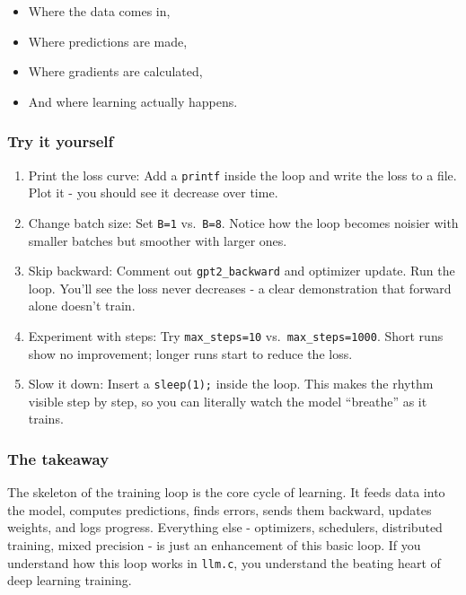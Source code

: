 \documentclass[
  letterpaper,
  DIV=11,
  numbers=noendperiod]{scrreprt}
\providecommand{\tightlist}{%
  \setlength{\itemsep}{0pt}\setlength{\parskip}{0pt}}
\begin{document}
\begin{itemize}
\tightlist
\item
  Where the data comes in,
\item
  Where predictions are made,
\item
  Where gradients are calculated,
\item
  And where learning actually happens.
\end{itemize}

\subsubsection{Try it yourself}\label{try-it-yourself-30}

\begin{enumerate}
\def\labelenumi{\arabic{enumi}.}
\tightlist
\item
  Print the loss curve: Add a \texttt{printf} inside the loop and write
  the loss to a file. Plot it - you should see it decrease over time.
\item
  Change batch size: Set \texttt{B=1} vs.~\texttt{B=8}. Notice how the
  loop becomes noisier with smaller batches but smoother with larger
  ones.
\item
  Skip backward: Comment out \texttt{gpt2\_backward} and optimizer
  update. Run the loop. You'll see the loss never decreases - a clear
  demonstration that forward alone doesn't train.
\item
  Experiment with steps: Try \texttt{max\_steps=10}
  vs.~\texttt{max\_steps=1000}. Short runs show no improvement; longer
  runs start to reduce the loss.
\item
  Slow it down: Insert a \texttt{sleep(1);} inside the loop. This makes
  the rhythm visible step by step, so you can literally watch the model
  ``breathe'' as it trains.
\end{enumerate}

\subsubsection{The takeaway}\label{the-takeaway-31}

The skeleton of the training loop is the core cycle of learning. It
feeds data into the model, computes predictions, finds errors, sends
them backward, updates weights, and logs progress. Everything else -
optimizers, schedulers, distributed training, mixed precision - is just
an enhancement of this basic loop. If you understand how this loop works
in \texttt{llm.c}, you understand the beating heart of deep learning
training.
\end{document}
